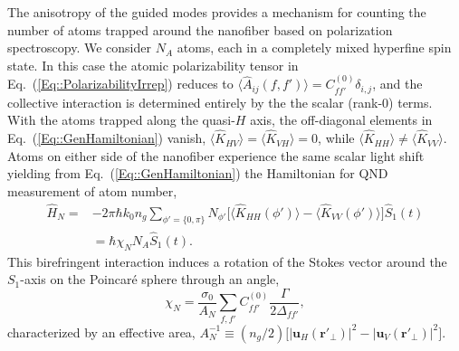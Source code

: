 \documentclass[preprint, aps,pra,onecolumn]{revtex4-1} %
\def\br{\mathbf{r}}
\newcommand{\erf}[1]{Eq.~(\ref{#1})}
\newcommand{\expt}[1]{\langle{#1}\rangle}
\newcommand{\polcomp}{\hat{K}} %
\newcommand{\chiN}{\chi_{N}}
\newcommand{\Abir}{A_N}
\begin{document}
The anisotropy of the guided modes provides a mechanism for counting the number of atoms trapped around the nanofiber based on polarization spectroscopy.  
We consider $N_A$ atoms, each in a completely mixed hyperfine spin state. In this case the atomic polarizability tensor in \erf{Eq::PolarizabilityIrrep} reduces to $\langle \hat{A}_{ij}(f,f') \rangle = C_{ff'}^{(0)} \delta_{i,j}$, and the collective interaction is determined entirely by the the scalar (rank-0) terms.  
With the atoms trapped along the quasi-$H$ axis, the off-diagonal elements in \erf{Eq::GenHamiltonian} vanish, $\expt{ \polcomp_{HV} } = \expt{ \polcomp_{VH} } =0$, while $\expt{ \polcomp_{HH} } \neq  \expt{ \polcomp_{VV} }$.  
Atoms on either side of the nanofiber experience the same scalar light shift yielding from  \erf{Eq::GenHamiltonian} the Hamiltonian for QND measurement of atom number,
	\begin{align}
		\hat{H}_{N} =& -2\pi \hbar k_0 n_g \sum_{\phi' = \{0,\pi \}} N_{\phi'} \big[ \expt{ \polcomp_{HH}(\phi')}  - \expt{ \polcomp_{VV}(\phi')} \big] \hat{S}_1(t)  \nonumber \\
		& =  \hbar \chiN N_A \hat{S}_1(t).  \label{Eq::MixedHamiltonian}
	\end{align}	
This birefringent interaction induces a rotation of the Stokes vector  around the $S_1$-axis on the Poincar\'{e} sphere through an angle, 
	\begin{equation} \label{Eq::RotationAngle}
		\chiN = \frac{\sigma_0}{\Abir}  \sum_{f,f'}  C_{ff'}^{(0)} \frac{\Gamma}{2 \Delta_{ff'}},
	\end{equation}
characterized by an effective area, $\Abir^{-1} \equiv (n_g/2) \big[ |\mathbf{u}_{H}(\br'_\perp)|^2 - |\mathbf{u}_{V}(\br'_\perp)| ^2 \big]$.   
\end{document}
